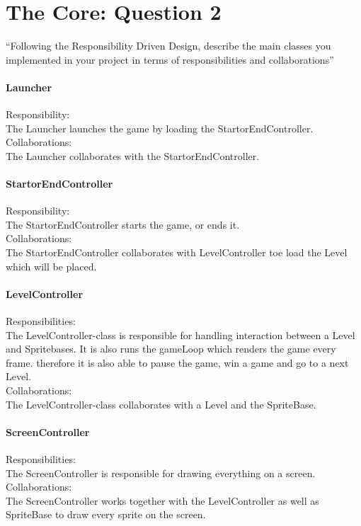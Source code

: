 \chapter{The Core: Question 2}

``Following the Responsibility Driven Design, describe the main classes you implemented in your project in terms of responsibilities and collaborations''

\subsubsection{Launcher}
Responsibility: \\
The Launcher launches the game by loading the StartorEndController. \\
Collaborations: \\
The Launcher collaborates with the StartorEndController. 

\subsubsection{StartorEndController}
Responsibility: \\
The StartorEndController starts the game, or ends it. \\
Collaborations: \\
The StartorEndController collaborates with LevelController toe load the Level which will be placed. 

\subsubsection{LevelController}
Responsibilities: \\
The LevelController-class is responsible for handling interaction between a Level and Spritebases. It is also runs the gameLoop which renders the game every frame. therefore it is also able to pause the game, win a game and go to a next Level. \\
Collaborations: \\
The LevelController-class collaborates with a Level and the SpriteBase.

\subsubsection{ScreenController}
Responsibilities: \\
The ScreenController is responsible for drawing everything on a screen. \\
Collaborations: \\
The ScreenController works together with the LevelController as well as SpriteBase to draw every sprite on the screen. 

